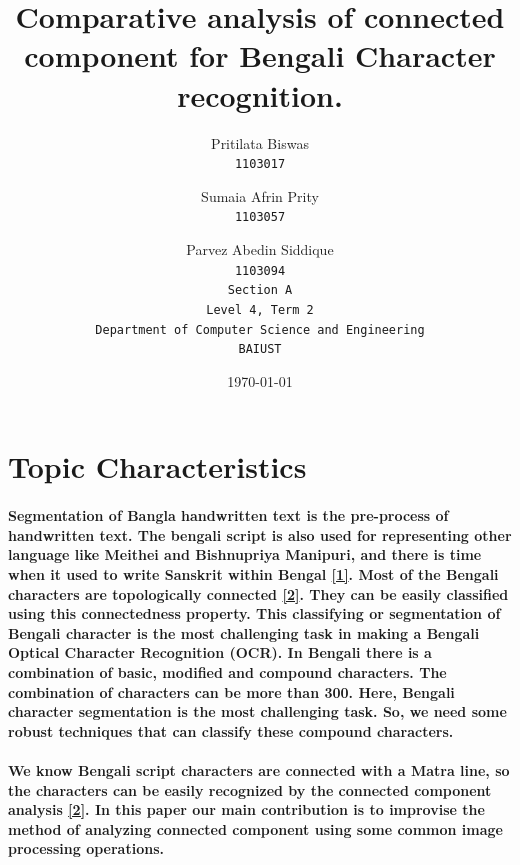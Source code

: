 \documentclass[a4paper,12pt]{article}
\begin{document}
\title{Comparative analysis of connected component for Bengali Character recognition.}

\author{
  Pritilata Biswas\\
  \texttt{1103017}
  \and
  Sumaia Afrin Prity\\
  \texttt{1103057}
  \and
  Parvez Abedin Siddique\\
  \texttt{1103094}\\
  \texttt{Section A}\\
  \texttt{Level 4, Term 2}\\
  \texttt{Department of Computer Science and Engineering}\\
  \texttt{BAIUST}
}

\date{\today}

\maketitle

\section{Topic Characteristics}

\paragraph*{Segmentation of Bangla handwritten text is the pre-process of handwritten text. The bengali script is also used for representing other language like Meithei and Bishnupriya Manipuri, and there is time when it used to write Sanskrit within Bengal \hyperlink{1}{[1]}. Most of the Bengali characters are topologically connected \hyperlink{2}{[2]}. They can be easily classified using this connectedness property. This classifying or segmentation of Bengali character is the most challenging task in making a Bengali Optical Character Recognition (OCR). In Bengali there is a combination of basic, modified and compound characters. The combination of characters can be more than 300. Here, Bengali character segmentation is the most challenging task. So, we need some robust techniques that can classify these compound characters.} 

\paragraph*{We know Bengali script characters are connected with a Matra line, so the characters can be easily recognized by the connected component analysis \hyperlink{2}{[2]}. In this paper our main contribution is to improvise the method of analyzing connected component using some common image processing operations. }
\end{document}
